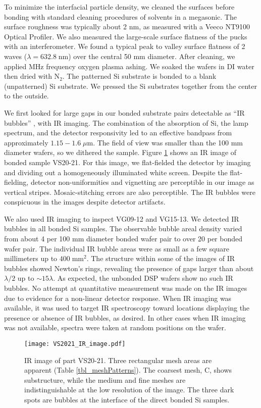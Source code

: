 \documentclass[osajnl,twocolumn,showpacs,superscriptaddress,11pt]{revtex4-1} %
\begin{document}
To minimize the interfacial particle density, we cleaned the surfaces before bonding with standard cleaning procedures of solvents in a megasonic.  The surface roughness was typically about 2 nm, as measured with a Veeco NT9100 Optical Profiler.  We also measured the large-scale surface flatness of the pucks with an interferometer.  We found a typical peak to valley surface flatness of 2 waves ($\lambda=632.8\;$nm) over the central 50 mm diameter.  After cleaning, we applied MHz frequency oxygen plasma ashing.  We soaked the wafers in DI water then dried with N$_2$.  The patterned Si substrate is bonded to a blank (unpatterned) Si substrate.  We pressed the Si substrates together from the center to the outside.

We first looked for large gaps in our bonded substrate pairs detectable as ``IR bubbles'' \cite{1992JEMat..21..669M}, with IR imaging.  The combination of the absorption of Si, the lamp spectrum, and the detector responsivity led to an effective bandpass from approximately $1.15-1.6\;\mu$m.  The field of view was smaller than the 100 mm diameter wafers, so we dithered the sample.  Figure \ref{figVS2021_IR_image} shows an IR image of bonded sample VS20-21.  For this image, we flat-fielded the detector by imaging and dividing out a homogeneously illuminated white screen. Despite the flat-fielding, detector non-uniformities and vignetting are perceptible in our image as vertical stripes.  Mosaic-stitching errors are also perceptible.  The IR bubbles were conspicuous in the images despite detector artifacts.

We also used IR imaging to inspect VG09-12 and VG15-13.  We detected IR bubbles in all bonded Si samples.  The observable bubble areal density varied from about 4 per 100 mm diameter bonded wafer pair to over 20 per bonded wafer pair.  The individual IR bubble areas were as small as a few square millimeters up to $400\;\mathrm{mm}^2$.  The structure within some of the images of IR bubbles showed Newton's rings, revealing the presence of gaps larger than about $\lambda/2$ up to $\sim 15 \lambda$.  As expected, the unbonded DSP wafers show no such IR bubbles.  No attempt at quantitative measurement was made on the IR images due to evidence for a non-linear detector response.  When IR imaging was available, it was used to target IR spectroscopy toward locations displaying the presence or absence of IR bubbles, as desired.  In other cases when IR imaging was not available, spectra were taken at random positions on the wafer.

\begin{figure}[htbp]
\texttt{[image: VS2021\_IR\_image.pdf]}
\caption{
\label{figVS2021_IR_image}
IR image of part VS20-21. Three rectangular mesh areas are apparent (Table \ref{tbl_meshPatterns}).  The coarsest mesh, C, shows substructure, while the medium and fine meshes are indistinguishable at the low resolution of the image.  The three dark spots are bubbles at the interface of the direct bonded Si samples.}
\end{figure}
\end{document}

